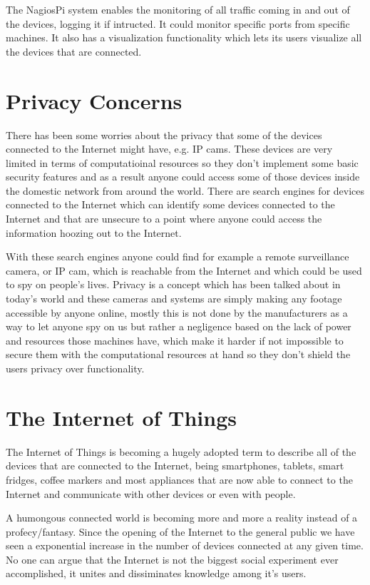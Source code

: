 The NagiosPi system enables the monitoring of all traffic coming in and out of
the devices, logging it if intructed. It could monitor specific ports from
specific machines. It also has a visualization functionality which lets its
users visualize all the devices that are connected.

\section{Privacy Concerns}
\label{chap2:sec:priv}
There has been some worries about the privacy that some of the devices
connected to the Internet might have, e.g. IP cams. These devices are very
limited in terms of computatioinal resources so they don't implement some basic
security features and as a result anyone could access some of those devices
inside the domestic network from around the world.
There are search engines for devices connected to the Internet which can
identify some devices connected to the Internet and that are unsecure to a
point where anyone could access the information hoozing out to the Internet.

With these search engines anyone could find for example a remote surveillance
camera, or IP cam, which is reachable from the Internet and which could be used
to spy on people's lives. Privacy is a concept which has been talked about in
today's world and these cameras and systems are simply making any footage
accessible by anyone online, mostly this is not done by the manufacturers as a
way to let anyone spy on us but rather a negligence based on the lack of power
and resources those machines have, which make it harder if not impossible to
secure them with the computational resources at hand so they don't shield the
users privacy over functionality.

\section{The Internet of Things}
\label{chap2:sec:iot}
The Internet of Things is becoming a hugely adopted term to describe all of the
devices that are connected to the Internet, being smartphones, tablets, smart
fridges, coffee markers and most appliances that are now able to connect to the
Internet and communicate with other devices or even with people.

A humongous connected world is becoming more and more a reality instead of a
profecy/fantasy. Since the opening of the Internet to the general public we
have seen a exponential increase in the number of devices connected at any
given time. No one can argue that the Internet is not the biggest social
experiment ever accomplished, it unites and dissiminates knowledge among it's
users.

